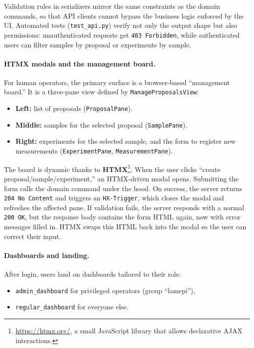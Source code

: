 Validation rules in serializers mirror the same constraints as the domain commands, 
so that API clients cannot bypass the business logic enforced by the UI.  
Automated tests (\texttt{test\_api.py}) verify not only the output shape but also permissions: 
unauthenticated requests get \texttt{403 Forbidden}, 
while authenticated users can filter samples by proposal or experiments by sample.

\paragraph{HTMX modals and the management board.}
For human operators, the primary surface is a browser-based “management board.”  
It is a three-pane view defined by \texttt{ManageProposalsView}:  
\begin{itemize}
	\item \textbf{Left:} list of proposals (\texttt{ProposalPane}).  
	\item \textbf{Middle:} samples for the selected proposal (\texttt{SamplePane}).  
	\item \textbf{Right:} experiments for the selected sample, and the form to register new measurements 
	(\texttt{ExperimentPane}, \texttt{MeasurementPane}).  
\end{itemize}

The board is dynamic thanks to \textbf{HTMX}\footnote{\url{https://htmx.org/}, a small JavaScript library that allows declarative AJAX interactions.}.  
When the user clicks “create proposal/sample/experiment,” an HTMX-driven modal opens.  
Submitting the form calls the domain command under the hood.  
On success, the server returns \texttt{204 No Content} and triggers an \texttt{HX-Trigger}, 
which closes the modal and refreshes the affected pane.  
If validation fails, the server responds with a normal \texttt{200 OK}, 
but the response body contains the form HTML again, now with error messages filled in. 
HTMX swaps this HTML back into the modal so the user can correct their input.

\paragraph{Dashboards and landing.}
After login, users land on dashboards tailored to their role:  
\begin{itemize}
	\item \texttt{admin\_dashboard} for privileged operators (group “lamepi”),  
	\item \texttt{regular\_dashboard} for everyone else.  
\end{itemize}

